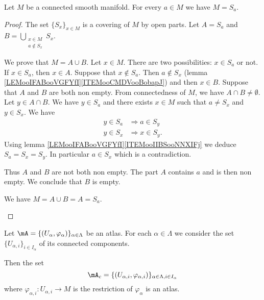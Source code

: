 \begin{proposition}
	Let \( M\) be a connected smooth manifold. For every \( a\in M\) we have \( M=S_a\).
\end{proposition}

\begin{proof}
	The set \( \{ S_x \}_{x\in M}\) is a covering of \( M\) by open parts. Let \( A=S_a\) and \( B=\bigcup_{\substack{ x\in M \\ a\not\in S_x }  }S_x \).
	\begin{subproof}
		\spitem[\( M=A\cup B\)]
		We prove that \( M=A\cup B\). Let \( x\in M\). There are two possibilities: \( x\in S_a\) or not. If \( x\in S_a\), then \( x\in A\). Suppose that \( x\not\in S_a\). Then \( a\not\in S_x\) (lemma \ref{LEMooIFABooVGFYfI}\ref{ITEMooCMDVooBobapJ}) and then \( x\in B\).
		\spitem[\( B=\emptyset\)]
		Suppose that \( A\) and \( B\) are both non empty. From connectedness of \( M\), we have \( A\cap B\neq\emptyset\). Let \( y\in A\cap B\). We have \( y\in S_a\) and there exists \( x\in M\) such that \( a\neq S_x\) and \( y\in S_x\). We have
		\begin{subequations}
			\begin{align}
				y\in S_a & \Rightarrow a\in S_y  \\
				y\in S_x & \Rightarrow x\in S_y.
			\end{align}
		\end{subequations}
		Using lemma \ref{LEMooIFABooVGFYfI}\ref{ITEMooIIBSooNNXIFj} we deduce \( S_a=S_x=S_y\). In particular \( a\in S_x\) which is a contradiction.

		Thus \( A\) and \( B\) are not both non empty. The part \( A\) contains \( a\) and is then non empty. We conclude that \( B\) is empty.

		\spitem[Conclusion]
		We have \( M=A\cup B=A=S_a\).
	\end{subproof}
\end{proof}

\begin{lemma}		\label{LEMooSDQUooWEagbY}
	Let \( \mA= \{ (U_{\alpha},\varphi_{\alpha}) \}_{\alpha\in \Lambda}\) be an atlas. For each \( \alpha\in \Lambda\) we consider the set \( \{ U_{\alpha,i} \}_{i\in I_{\alpha}}\) of its connected components.

	Then the set
	\begin{equation}
		\mA_c=\{ (U_{\alpha,i},\varphi_{\alpha,i}) \}_{\alpha\in\Lambda, i\in I_{\alpha}}
	\end{equation}
	where \(\varphi_{\alpha,i} \colon U_{\alpha,i}\to M  \) is the restriction of \( \varphi_{\alpha}\) is an atlas.
\end{lemma}

